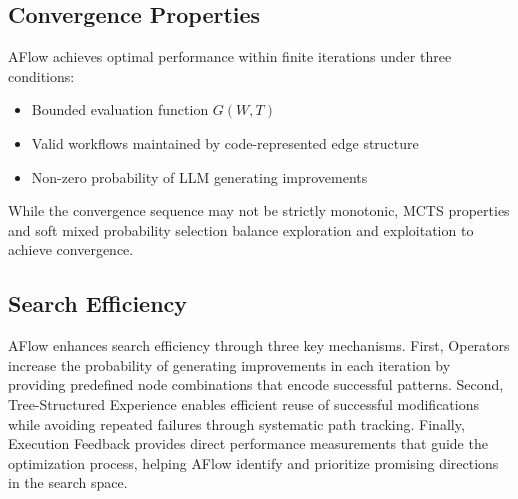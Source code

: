 \documentclass{article} %
\newcommand{\model}{{\sc AFlow}\xspace}
\theoremstyle{plain}
\theoremstyle{definition}
\theoremstyle{remark}
\begin{document}
\subsection{Convergence Properties}
\model achieves optimal performance within finite iterations under three conditions:
\begin{itemize}[leftmargin=20pt]
\item Bounded evaluation function $G(W,T)$
\item Valid workflows maintained by code-represented edge structure
\item Non-zero probability of LLM generating improvements
\end{itemize}
While the convergence sequence may not be strictly monotonic, MCTS properties and soft mixed probability selection balance exploration and exploitation to achieve convergence.

\subsection{Search Efficiency}

\model enhances search efficiency through three key mechanisms. First, Operators increase the probability of generating improvements in each iteration by providing predefined node combinations that encode successful patterns. Second, Tree-Structured Experience enables efficient reuse of successful modifications while avoiding repeated failures through systematic path tracking. Finally, Execution Feedback provides direct performance measurements that guide the optimization process, helping \model identify and prioritize promising directions in the search space.


\end{document}
